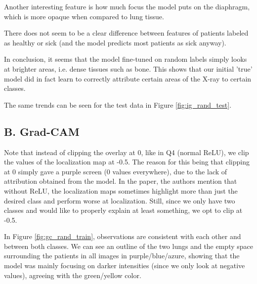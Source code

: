 Another interesting feature is how much focus the model puts on the diaphragm, which is more opaque when compared to lung tissue.

There does not seem to be a clear difference between features of patients labeled as healthy or sick (and the model predicts most patients as sick anyway).

In conclusion, it seems that the model fine-tuned on random labels simply looks at brighter areas, i.e. dense tissues such as bone. This shows that our initial 'true' model did in fact learn to correctly attribute certain areas of the X-ray to certain classes.

The same trends can be seen for the test data in Figure \ref{fig:ig_rand_test}.


\subsection*{B. Grad-CAM}

Note that instead of clipping the overlay at 0, like in Q4 (normal ReLU), we clip the values of the localization map at -0.5. The reason for this being that clipping at 0 simply gave a purple screen (0 values everywhere), due to the lack of attribution obtained from the model. In the paper, the authors mention that without ReLU, the localization maps sometimes highlight more than just the desired class and perform worse at localization. Still, since we only have two classes and would like to properly explain at least something, we opt to clip at -0.5.

In Figure \ref{fig:gc_rand_train}, observations are consistent with each other and between both classes. We can see an outline of the two lungs and the empty space surrounding the patients in all images in purple/blue/azure, showing that the model was mainly focusing on darker intensities (since we only look at negative values), agreeing with the green/yellow color.

